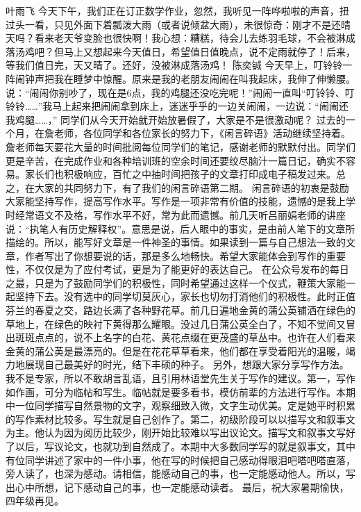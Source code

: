 {}\markdownRendererInterblockSeparator
{}叶雨飞\markdownRendererInterblockSeparator
{}今天下午，我们正在订正数学作业，忽然，我听见一阵哗啦啦的声音，扭过头一看，只见外面下着瓢泼大雨（或者说倾盆大雨），未很惊奇：刚才不是还晴天吗？看来老天爷变脸也很快啊！我心想：糟糕，待会儿去练羽毛球，不会被淋成落汤鸡吧？但马上又想起来今天值日，希望值日值晚点，说不定雨就停了！后来，等我们值日完，天又晴了。还好，没被淋成落汤鸡！\markdownRendererInterblockSeparator
{}\markdownRendererInterblockSeparator
{}陈奕铖\markdownRendererInterblockSeparator
{}今天早上，叮铃铃一阵闹钟声把我在睡梦中惊醒。原来是我的老朋友闹闹在叫我起床，我伸了伸懒腰。说：“闹闹你别吵了，现在是6点，我的鸡腿还没吃完呢！”闹闹一直叫“叮铃铃、叮铃铃……”我马上起来把闹闹拿到床上，迷迷乎乎的一边关闹闹，一边说：“闹闹还我鸡腿……，”\markdownRendererInterblockSeparator
{}\markdownRendererInterblockSeparator
{}同学们从今天开始就开始放暑假了，大家是不是很激动呢？\markdownRendererInterblockSeparator
{}过去的一个月，在詹老师，各位同学和各位家长的努力下，《闲言碎语》活动继续坚持着。詹老师每天要花大量的时间批阅每位同学们的笔记，感谢老师的默默付出。同学们更是辛苦，在完成作业和各种培训班的空余时间还要绞尽脑汁一篇日记，确实不容易。家长们也积极响应，百忙之中抽时间把孩子的文章打印成电子稿发过来。总之，在大家的共同努力下，有了我们的闲言碎语第二期。\markdownRendererInterblockSeparator
{}闲言碎语的初衷是鼓励大家能坚持写作，提高写作水平。写作是一项非常有价值的技能，遗憾的是我上学时经常语文不及格，写作水平不好，常为此而遗憾。前几天听吕丽娟老师的讲座说：“执笔人有历史解释权”。意思是说，后人眼中的事实，是由前人笔下的文章所描绘的。所以，能写好文章是一件神圣的事情。如果读到一篇与自己想法一致的文章，作者写出了你想要说的话，那是多么地畅快。希望大家能体会到写作的重要性，不仅仅是为了应付考试，更是为了能更好的表达自己。\markdownRendererInterblockSeparator
{}在公众号发布的每日之最，只是为了鼓励同学们的积极性，同时希望通过这样一个仪式，鞭策大家能一起坚持下去。没有选中的同学切莫灰心，家长也切勿打消他们的积极性。此时正值芬兰的春夏之交，路边长满了各种野花草。前几日遍地金黄的蒲公英铺洒在绿色的草地上，在绿色的映衬下黄得那么耀眼。没过几日蒲公英全白了，不知不觉间又冒出斑斑点点的，说不上名字的白花、黄花点缀在更茂盛的草丛中。也许在人们看来金黄的蒲公英是最漂亮的。但是在花花草草看来，他们都在享受着阳光的温暖，竭力地展现自己最美好的时光，结下丰硕的种子。\markdownRendererInterblockSeparator
{}另外，想跟大家分享写作方法。我不是专家，所以不敢胡言乱语，且引用林语堂先生关于写作的建议。第一，写作如作画，可分为临帖和写生。临帖就是要多看书，模仿前辈的方法进行写作。本期中一位同学描写自然景物的文字，观察细致入微，文字生动优美。定是她平时积累的写作素材比较多。写生就是自己创作了。第二，初级阶段可以以描写文和叙事文为主。他认为因为阅历比较少，刚开始比较难以写出议论文。描写文和叙事文写好了以后，写议论文，也就功到自然成了。本期中大多数同学写的就是叙事文，其中有位同学讲述了家中的一件小事，他在写的时候把自己感动得眼泪吧嗒吧嗒直落，旁人读了，也深为感动。请相信，能感动自己的事，也一定能感动他人。所以，写出心中所想，记下感动自己的事，也一定能感动读者。\markdownRendererInterblockSeparator
{}最后，祝大家暑期愉快，四年级再见。\markdownRendererDocumentEnd